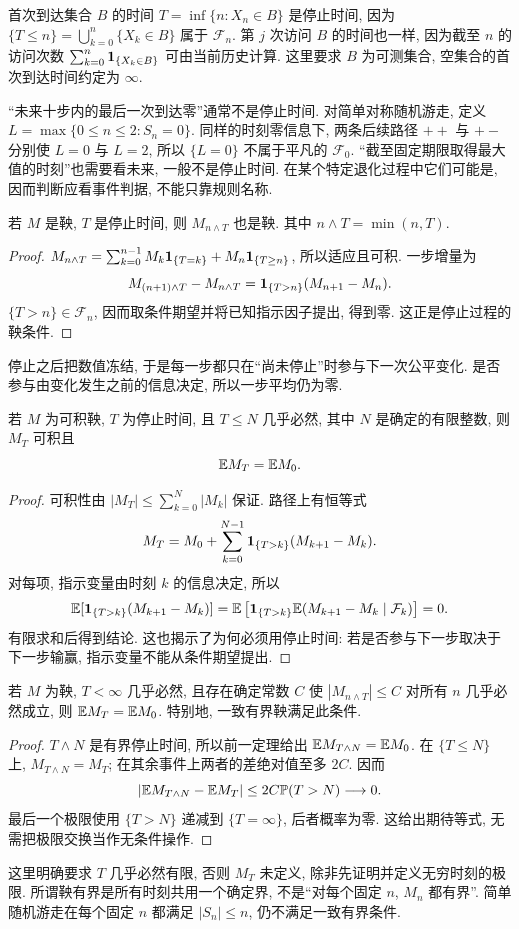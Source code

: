 首次到达集合 $B$ 的时间 $T=\inf\{n:X_n\in B\}$ 是停止时间, 因为
$\{T\leq n\}=\bigcup_{k=0}^n\{X_k\in B\}$ 属于 $\mathcal F_n$. 第 $j$ 次访问 $B$ 的时间也一样, 因为截至 $n$ 的访问次数 $\sum_{k=0}^n\mathbf 1_{\{X_k\in B\}}$ 可由当前历史计算. 这里要求 $B$ 为可测集合, 空集合的首次到达时间约定为 $\infty$.

“未来十步内的最后一次到达零”通常不是停止时间. 对简单对称随机游走, 定义 $L=\max\{0\leq n\leq2:S_n=0\}$. 同样的时刻零信息下, 两条后续路径 $++$ 与 $+-$ 分别使 $L=0$ 与 $L=2$, 所以 $\{L=0\}$ 不属于平凡的 $\mathcal F_0$. “截至固定期限取得最大值的时刻”也需要看未来, 一般不是停止时间. 在某个特定退化过程中它们可能是, 因而判断应看事件判据, 不能只靠规则名称.

\begin{proposition}[停止后的过程仍是鞅]
若 $M$ 是鞅, $T$ 是停止时间, 则 $M_{n\wedge T}$ 也是鞅. 其中 $n\wedge T=\min(n,T)$.
\end{proposition}
\begin{proof}
$M_{n\wedge T}=\sum_{k=0}^{n-1}M_k\mathbf 1_{\{T=k\}}+M_n\mathbf 1_{\{T\geq n\}}$, 所以适应且可积. 一步增量为
\[
 M_{(n+1)\wedge T}-M_{n\wedge T}
 =\mathbf 1_{\{T>n\}}(M_{n+1}-M_n).
\]
$\{T>n\}\in\mathcal F_n$, 因而取条件期望并将已知指示因子提出, 得到零. 这正是停止过程的鞅条件.
\end{proof}
停止之后把数值冻结, 于是每一步都只在“尚未停止”时参与下一次公平变化. 是否参与由变化发生之前的信息决定, 所以一步平均仍为零.

\begin{theorem}[有界停止时间]
若 $M$ 为可积鞅, $T$ 为停止时间, 且 $T\leq N$ 几乎必然, 其中 $N$ 是确定的有限整数, 则 $M_T$ 可积且
\[
 \mathbb E M_T=\mathbb E M_0.
\]
\end{theorem}
\begin{proof}
可积性由 $|M_T|\leq\sum_{k=0}^N|M_k|$ 保证. 路径上有恒等式
\[
 M_T=M_0+\sum_{k=0}^{N-1}\mathbf 1_{\{T>k\}}(M_{k+1}-M_k).
\]
对每项, 指示变量由时刻 $k$ 的信息决定, 所以
\[
 \mathbb E[\mathbf 1_{\{T>k\}}(M_{k+1}-M_k)]
 =\mathbb E\left[\mathbf 1_{\{T>k\}}\mathbb E(M_{k+1}-M_k\mid\mathcal F_k)\right]=0.
\]
有限求和后得到结论. 这也揭示了为何必须用停止时间: 若是否参与下一步取决于下一步输赢, 指示变量不能从条件期望提出.
\end{proof}

\begin{theorem}[有界过程与几乎必然有限的停止时间]
若 $M$ 为鞅, $T<\infty$ 几乎必然, 且存在确定常数 $C$ 使
$|M_{n\wedge T}|\leq C$ 对所有 $n$ 几乎必然成立, 则
$\mathbb E M_T=\mathbb E M_0$. 特别地, 一致有界鞅满足此条件.
\end{theorem}
\begin{proof}
$T\wedge N$ 是有界停止时间, 所以前一定理给出
$\mathbb E M_{T\wedge N}=\mathbb E M_0$. 在 $\{T\leq N\}$ 上,
$M_{T\wedge N}=M_T$; 在其余事件上两者的差绝对值至多 $2C$. 因而
\[
 |\mathbb E M_{T\wedge N}-\mathbb E M_T|\leq2C\mathbb P(T>N)\longrightarrow0.
\]
最后一个极限使用 $\{T>N\}$ 递减到 $\{T=\infty\}$, 后者概率为零. 这给出期待等式, 无需把极限交换当作无条件操作.
\end{proof}
这里明确要求 $T$ 几乎必然有限, 否则 $M_T$ 未定义, 除非先证明并定义无穷时刻的极限. 所谓鞅有界是所有时刻共用一个确定界, 不是“对每个固定 $n$, $M_n$ 都有界”. 简单随机游走在每个固定 $n$ 都满足 $|S_n|\leq n$, 仍不满足一致有界条件.

